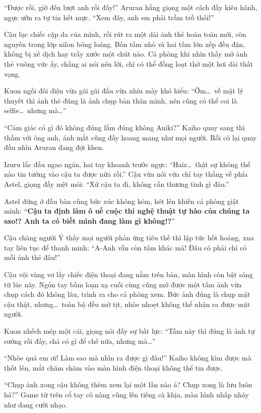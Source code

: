 \documentclass[../main.tex]{subfiles}
\begin{document}
\ct

``Được rồi, giờ đến lượt anh rồi đấy!'' Aruran hắng giọng một cách đầy kiêu hãnh, ngực ưỡn ra tự tin hết mực. ``Xem đây, anh em phải trầm trồ thôi!''

Cậu lục chiếc cặp da của mình, rồi rút ra một dải ảnh thẻ hoàn toàn mới, còn nguyên trong lớp nilon bóng loáng. Bốn tấm nhỏ và hai tấm lớn xếp đều đặn, không bị xê dịch hay trầy xước một chút nào. Cả phòng khi nhìn thấy mớ ảnh thẻ vuông vức ấy, chẳng ai nói nên lời, chỉ có thể đồng loạt thở một hơi dài thất vọng.


Kuon ngồi đối diện vừa gãi gãi đầu vừa nhíu mày khó hiểu: ``Ờm\dots\ về mặt lý thuyết thì ảnh thẻ đúng là ảnh chụp bản thân mình, nên cũng có thể coi là selfie\dots\ nhưng mà\dots''

``Cảm giác có gì đó không đúng lắm đúng không Aniki?'' Kaiho quay sang thì thầm với ông anh, ánh mắt cũng đầy hoang mang như mọi người. Rồi cô lại quay đầu nhìn Aruran đang đợi khen.

Izuru lắc đầu ngao ngán, hai tay khoanh trước ngực: ``Haiz\dots\ thật sự không thể nào tin tưởng vào cậu ta được nữa rồi.'' Cậu vừa nói vừa chỉ tay thẳng về phía Astel, giọng đầy mệt mỏi: ``Xử cậu ta đi, không cần thương tình gì đâu.''

Astel đứng ở đầu bàn cũng bức xúc không kém, hét lên khiến cả phòng giật mình: ``\textbf{Cậu ta định làm ô uế cuộc thi nghệ thuật tự hào của chúng ta sao!? Anh ta có biết mình đang làm gì không!?}''

Cậu chàng người Ý thấy mọi người phản ứng tiêu thế thì lập tức hốt hoảng, xua tay liên tục để thanh minh: ``A-Anh vẫn còn tấm khác mà! Đâu có phải chỉ có mỗi ảnh thẻ đâu!''

Cậu vội vàng vơ lấy chiếc điện thoại đang nằm trên bàn, màn hình còn bật sáng từ lúc nãy. Ngón tay bấm loạn xạ cuối cùng cũng mở được một tấm ảnh vừa chụp cách đó không lâu, trình ra cho cả phòng xem. Bức ảnh đúng là chụp mặt cậu thật, nhưng\dots\ toàn bộ đều mờ tịt, nhòe nhoẹt không thể nhận ra được mặt người.


Kuon nhếch mép một cái, giọng nói đầy sự bất lực: ``Tấm này thì đúng là ảnh tự sướng rồi đấy, chả có gì để chê nữa, nhưng mà\dots''

``Nhòe quá em ơi! Làm sao mà nhìn ra được gì đâu!'' Kaiho không kìm được mà thốt lên, mắt chăm chăm vào màn hình điện thoại không thể tin được.

``Chụp ảnh xong cậu không thèm xem lại một lần nào à? Chụp xong là lưu luôn hả?'' Game từ trên cổ tay cô nàng cũng lên tiếng cà khịa, màn hình nhấp nháy như đang cười nhạo.
\end{document}

